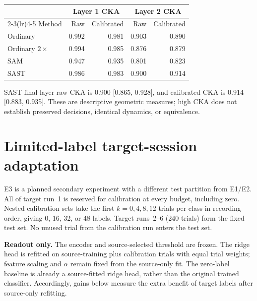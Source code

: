 \documentclass[11pt,a4paper]{article}
\begin{document}
\begin{center}\small\setlength{\tabcolsep}{5pt}
\begin{tabular}{lrrrr}
\toprule
& \multicolumn{2}{c}{Layer 1 CKA} & \multicolumn{2}{c}{Layer 2 CKA} \\
\cmidrule(lr){2-3}\cmidrule(lr){4-5}
Method & Raw & Calibrated & Raw & Calibrated \\
\midrule
Ordinary & 0.992 & 0.981 & 0.903 & 0.890 \\
Ordinary $2\times$ & 0.994 & 0.985 & 0.876 & 0.879 \\
SAM & 0.947 & 0.935 & 0.801 & 0.823 \\
SAST & 0.986 & 0.983 & 0.900 & 0.914 \\
\bottomrule
\end{tabular}\end{center}
SAST final-layer raw CKA is 0.900 [0.865, 0.928], and calibrated CKA is
0.914 [0.883, 0.935]. These are descriptive geometric measures; high CKA
does not establish preserved decisions, identical dynamics, or equivalence.

\clearpage
\section{Limited-label target-session adaptation}

E3 is a planned secondary experiment with a different test partition from
E1/E2. All of target run~1 is reserved for calibration at every budget,
including zero. Nested calibration sets take the first $k=0,4,8,12$ trials
per class in recording order, giving 0, 16, 32, or 48 labels. Target runs~2--6
(240 trials) form the fixed test set. No unused trial from the calibration
run enters the test set.

\textbf{Readout only.} The encoder and source-selected threshold are frozen.
The ridge head is refitted on source-training plus calibration trials with
equal trial weights; feature scaling and $\alpha$ remain fixed from the
source-only fit. The zero-label baseline is already a source-fitted ridge
head, rather than the original trained classifier. Accordingly, gains below
measure the extra benefit of target labels after source-only refitting.
\end{document}
